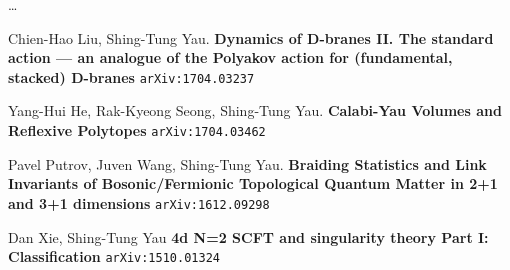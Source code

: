 \documentclass[12pt]{article}
\begin{document}
\newpage

\noindent \dots

\vfill

\begin{thebibliography}{}

\item Chien-Hao Liu, Shing-Tung Yau. \textbf{Dynamics of D-branes II. The standard action --- an analogue of the Polyakov action for (fundamental, stacked) D-branes} \texttt{arXiv:1704.03237}

\item Yang-Hui He, Rak-Kyeong Seong, Shing-Tung Yau. \textbf{Calabi-Yau Volumes and Reflexive Polytopes} \texttt{arXiv:1704.03462}


\item Pavel Putrov, Juven Wang, Shing-Tung Yau. \textbf{Braiding Statistics and Link Invariants of Bosonic/Fermionic Topological Quantum Matter in 2+1 and 3+1 dimensions} \texttt{arXiv:1612.09298}

\item Dan Xie, Shing-Tung Yau \textbf{4d N=2 SCFT and singularity theory Part I: Classification} \texttt{arXiv:1510.01324} 





\end{thebibliography}
\end{document}
